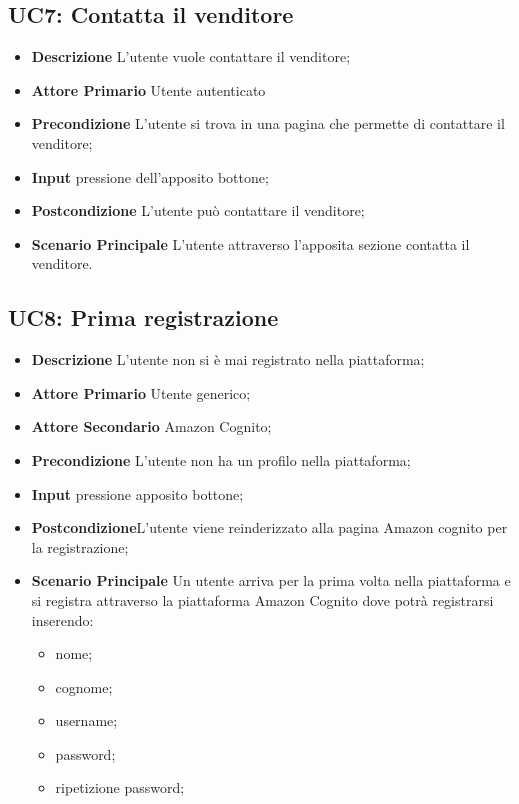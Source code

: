         \subsection{UC7: Contatta il venditore}
        \label{sec:UC7}
        \begin{itemize}
            \item \textbf{Descrizione} L'utente vuole contattare il venditore;
            \item \textbf{Attore Primario} Utente autenticato
            \item \textbf{Precondizione} L'utente si trova in una pagina che permette di contattare il venditore;
            \item \textbf{Input} pressione dell'apposito bottone;
            \item \textbf{Postcondizione} L'utente può contattare il venditore;
            \item \textbf{Scenario Principale} L'utente attraverso l'apposita sezione contatta il venditore.
        \end{itemize}
        \subsection{UC8: Prima registrazione}
        \label{sec:UC8}
        \begin{itemize}
            \item \textbf{Descrizione} L'utente non si è mai registrato nella piattaforma;
            \item \textbf{Attore Primario} Utente generico;
            \item \textbf{Attore Secondario} Amazon Cognito;
            \item \textbf{Precondizione} L'utente non ha un profilo nella piattaforma;
            \item \textbf{Input} pressione apposito bottone;
            \item \textbf{Postcondizione}L'utente viene reinderizzato alla pagina Amazon cognito per la registrazione;
            \item \textbf{Scenario Principale} Un utente arriva per la prima volta nella piattaforma e si registra attraverso la piattaforma Amazon Cognito dove potrà registrarsi inserendo:
            \begin{itemize}
                \item nome;
                \item cognome;
                \item username;
                \item password;
                \item ripetizione password;
            \end{itemize}
        \end{itemize}
